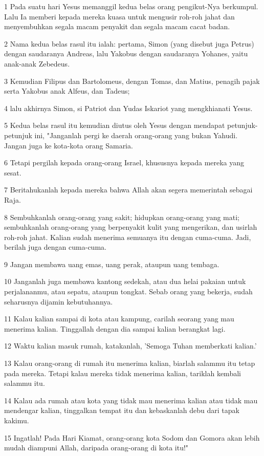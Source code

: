 \par 1 Pada suatu hari Yesus memanggil kedua belas orang pengikut-Nya berkumpul. Lalu Ia memberi kepada mereka kuasa untuk mengusir roh-roh jahat dan menyembuhkan segala macam penyakit dan segala macam cacat badan.
\par 2 Nama kedua belas rasul itu ialah: pertama, Simon (yang disebut juga Petrus) dengan saudaranya Andreas, lalu Yakobus dengan saudaranya Yohanes, yaitu anak-anak Zebedeus.
\par 3 Kemudian Filipus dan Bartolomeus, dengan Tomas, dan Matius, penagih pajak serta Yakobus anak Alfeus, dan Tadeus;
\par 4 lalu akhirnya Simon, si Patriot dan Yudas Iskariot yang mengkhianati Yesus.
\par 5 Kedua belas rasul itu kemudian diutus oleh Yesus dengan mendapat petunjuk-petunjuk ini, "Janganlah pergi ke daerah orang-orang yang bukan Yahudi. Jangan juga ke kota-kota orang Samaria.
\par 6 Tetapi pergilah kepada orang-orang Israel, khususnya kepada mereka yang sesat.
\par 7 Beritahukanlah kepada mereka bahwa Allah akan segera memerintah sebagai Raja.
\par 8 Sembuhkanlah orang-orang yang sakit; hidupkan orang-orang yang mati; sembuhkanlah orang-orang yang berpenyakit kulit yang mengerikan, dan usirlah roh-roh jahat. Kalian sudah menerima semuanya itu dengan cuma-cuma. Jadi, berilah juga dengan cuma-cuma.
\par 9 Jangan membawa uang emas, uang perak, ataupun uang tembaga.
\par 10 Janganlah juga membawa kantong sedekah, atau dua helai pakaian untuk perjalananmu, atau sepatu, ataupun tongkat. Sebab orang yang bekerja, sudah seharusnya dijamin kebutuhannya.
\par 11 Kalau kalian sampai di kota atau kampung, carilah seorang yang mau menerima kalian. Tinggallah dengan dia sampai kalian berangkat lagi.
\par 12 Waktu kalian masuk rumah, katakanlah, 'Semoga Tuhan memberkati kalian.'
\par 13 Kalau orang-orang di rumah itu menerima kalian, biarlah salammu itu tetap pada mereka. Tetapi kalau mereka tidak menerima kalian, tariklah kembali salammu itu.
\par 14 Kalau ada rumah atau kota yang tidak mau menerima kalian atau tidak mau mendengar kalian, tinggalkan tempat itu dan kebaskanlah debu dari tapak kakimu.
\par 15 Ingatlah! Pada Hari Kiamat, orang-orang kota Sodom dan Gomora akan lebih mudah diampuni Allah, daripada orang-orang di kota itu!"
